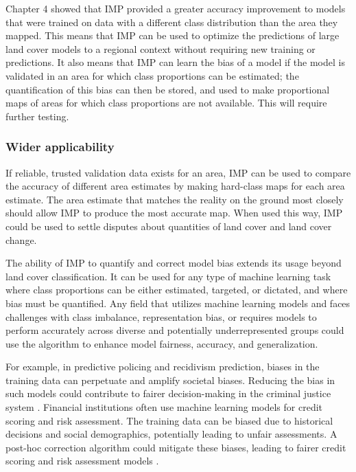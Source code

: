         Chapter 4 showed that IMP provided a greater accuracy improvement to models that were trained on data with a different class distribution than the area they mapped. This means that IMP can be used to optimize the predictions of large land cover models to a regional context without requiring new training or predictions. It also means that IMP can learn the bias of a model if the model is validated in an area for which class proportions can be estimated; the quantification of this bias can then be stored, and used to make proportional maps of areas for which class proportions are not available. This will require further testing. 

        \subsubsection{Wider applicability}

        If reliable, trusted validation data exists for an area, IMP can be used to compare the accuracy of different area estimates by making hard-class maps for each area estimate. The area estimate that matches the reality on the ground most closely should allow IMP to produce the most accurate map. When used this way, IMP could be used to settle disputes about quantities of land cover and land cover change.
        
        The ability of IMP to quantify and correct model bias extends its usage beyond land cover classification. It can be used for any type of machine learning task where class proportions can be either estimated, targeted, or dictated, and where bias must be quantified. Any field that utilizes machine learning models and faces challenges with class imbalance, representation bias, or requires models to perform accurately across diverse and potentially underrepresented groups could use the algorithm to enhance model fairness, accuracy, and generalization.
        
        For example, in predictive policing and recidivism prediction, biases in the training data can perpetuate and amplify societal biases. Reducing the bias in such models could contribute to fairer decision-making in the criminal justice system \citep{berk2021fairness, dressel2018accuracy}. Financial institutions often use machine learning models for credit scoring and risk assessment. The training data can be biased due to historical decisions and social demographics, potentially leading to unfair assessments. A post-hoc correction algorithm could mitigate these biases, leading to fairer credit scoring and risk assessment models \citep{chen2018why, kamiran2012data}. 


